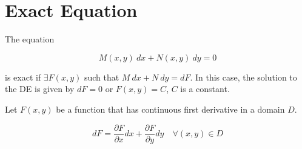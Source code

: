 \section{Exact Equation}

The equation 

\begin{equation}
    M(x, y)\> dx + N(x,y)\> dy = 0
\end{equation}

is exact if $\exists F(x,y)$ such that $M\> dx + N\> dy = dF$. In this case, the solution to the DE 
is given by $dF = 0$ or $F(x,y) = C$, $C$ is a constant.

\begin{definition}
    Let $F(x,y)$ be a function that has continuous first derivative in a 
    domain $D$.

    \begin{equation}
        dF = \frac{\partial F}{\partial x}dx + \frac{\partial F}{\partial y}dy 
        \quad \forall (x,y) \in D
    \end{equation}
\end{definition}

